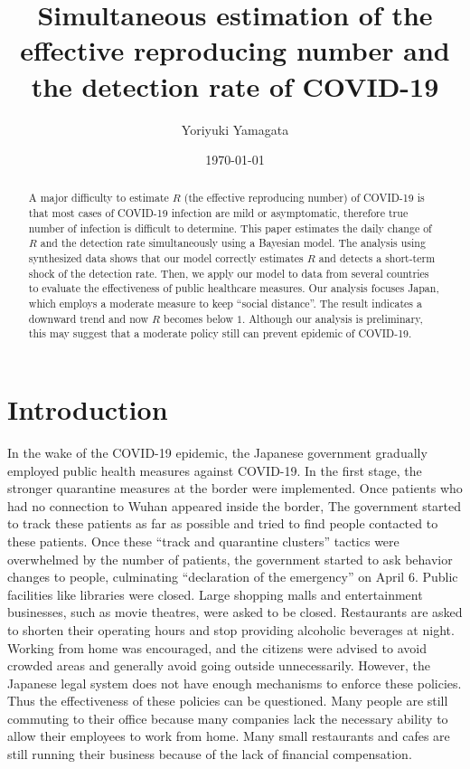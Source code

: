 \documentclass{amsart}
\title[Simultaneous estimation of $R$ and the detection rate]{Simultaneous estimation of the effective reproducing number and the detection rate of COVID-19}
\author{Yoriyuki Yamagata}
\date{\today}
\begin{document}
\maketitle

\begin{abstract}
 A major difficulty to estimate $R$ (the effective reproducing number) of COVID-19 is that most cases of COVID-19 infection are mild or asymptomatic, therefore true number of infection is difficult to determine.
 This paper estimates the daily change of $R$ and the detection rate simultaneously using a Bayesian model.
 The analysis using synthesized data shows that our model correctly estimates $R$ and detects a short-term shock of the detection rate.
 Then, we apply our model to data from several countries to evaluate the effectiveness of public healthcare measures.
 Our analysis focuses Japan, which employs a moderate measure to keep ``social distance''.
 The result indicates a downward trend and now $R$ becomes below $1$.
 Although our analysis is preliminary, this may suggest that a moderate policy still can prevent epidemic of COVID-19.
\end{abstract}

\section{Introduction}

In the wake of the COVID-19 epidemic, the Japanese government gradually employed public health measures against COVID-19.
In the first stage, the stronger quarantine measures at the border were implemented.
Once patients who had no connection to Wuhan appeared inside the border, The government started to track these patients as far as possible and tried to find people contacted to these patients.
Once these ``track and quarantine clusters'' tactics were overwhelmed by the number of patients, the government started to ask behavior changes to people, culminating ``declaration of the emergency'' on April 6.
Public facilities like libraries were closed.
Large shopping malls and entertainment businesses, such as movie theatres, were asked to be closed.
Restaurants are asked to shorten their operating hours and stop providing alcoholic beverages at night.
Working from home was encouraged, and the citizens were advised to avoid crowded areas and generally avoid going outside unnecessarily.
However, the Japanese legal system does not have enough mechanisms to enforce these policies.
Thus the effectiveness of these policies can be questioned.
Many people are still commuting to their office because many companies lack the necessary ability to allow their employees to work from home.
Many small restaurants and cafes are still running their business because of the lack of financial compensation.
\end{document}
